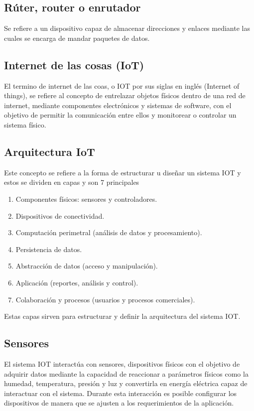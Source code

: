 \subsection{Rúter, router o enrutador}
Se refiere a un dispositivo capaz de almacenar direcciones y enlaces mediante las cuales se encarga de mandar paquetes de datos.\cite{kamal_2017}

\subsection{Internet de las cosas (IoT)}
El termino de internet de las coas, o IOT por sus siglas en inglés (Internet of things), se refiere al concepto de entrelazar objetos físicos dentro de una red de internet, mediante componentes electrónicos y sistemas de software, con el objetivo de permitir la comunicación entre ellos y monitorear o controlar un sistema físico. \cite{kamal_2017}

\subsection{Arquitectura IoT}
Este concepto se refiere a la forma de estructurar u diseñar un sistema IOT y estos se dividen en capas y son 7 principales
\begin{enumerate}
  \renewcommand\labelenumi{\arabic{enumi}.}
  \item Componentes físicos: sensores y controladores.
  \item Dispositivos de conectividad.
  \item Computación perimetral (análisis de datos y procesamiento).
  \item Persistencia de datos.
  \item Abstracción de datos (acceso y manipulación).
  \item Aplicación (reportes, análisis y control).
  \item Colaboración y procesos (usuarios y procesos comerciales).
\end{enumerate}
Estas capas sirven para estructurar y definir la arquitectura del sistema IOT.\cite{kamal_2017}


\subsection{Sensores}
El sistema IOT interactúa con sensores, dispositivos físicos con el objetivo de adquirir datos mediante la capacidad de reaccionar a parámetros físicos como la humedad, temperatura, presión y luz y convertirla en energía eléctrica capaz de interactuar con el sistema. Durante esta interacción es posible configurar los dispositivos de manera que se ajusten a los requerimientos de la aplicación.\cite{kamal_2017}


